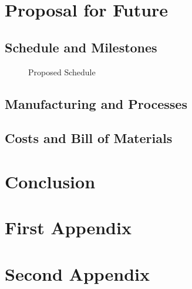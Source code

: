 \documentclass[letterpaper,12pt]{article}
\begin{document}
\section{Proposal for Future}\label{sec:proposal}

\subsection{Schedule and Milestones}

\begin{figure}
    \centering
    
    \caption{Proposed Schedule}
    \label{fig:sched}
\end{figure}

\subsection{Manufacturing and Processes}

\subsection{Costs and Bill of Materials}

\section{Conclusion}\label{sec:conc}



\clearpage

\appendix
\appendixpage
{}
\startcontents[sections]
\clearpage

\section{First Appendix}\label{app:first}
\lipsum
\clearpage

\section{Second Appendix}\label{app:second}
\lipsum
\clearpage
\end{document}
